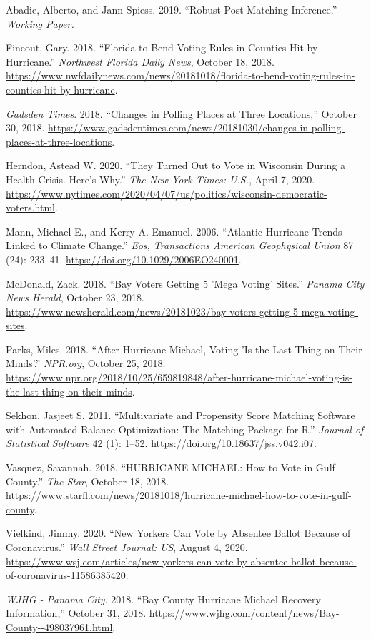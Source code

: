 \documentclass[
  12pt,
]{article}
\newlength{\cslhangindent}
\newenvironment{cslreferences}%
  {\setlength{\parindent}{0pt}%
  \everypar{\setlength{\hangindent}{\cslhangindent}}\ignorespaces}%
  {\par}
\begin{document}
\hypertarget{refs}{}
\begin{cslreferences}
\leavevmode\hypertarget{ref-Abadie2019}{}%
Abadie, Alberto, and Jann Spiess. 2019. ``Robust Post-Matching Inference.'' \emph{Working Paper.}

\leavevmode\hypertarget{ref-Fineout2018}{}%
Fineout, Gary. 2018. ``Florida to Bend Voting Rules in Counties Hit by Hurricane.'' \emph{Northwest Florida Daily News}, October 18, 2018. \url{https://www.nwfdailynews.com/news/20181018/florida-to-bend-voting-rules-in-counties-hit-by-hurricane}.

\leavevmode\hypertarget{ref-gadsdentimes2018}{}%
\emph{Gadsden Times}. 2018. ``Changes in Polling Places at Three Locations,'' October 30, 2018. \url{https://www.gadsdentimes.com/news/20181030/changes-in-polling-places-at-three-locations}.

\leavevmode\hypertarget{ref-Herndon2020}{}%
Herndon, Astead W. 2020. ``They Turned Out to Vote in Wisconsin During a Health Crisis. Here's Why.'' \emph{The New York Times: U.S.}, April 7, 2020. \url{https://www.nytimes.com/2020/04/07/us/politics/wisconsin-democratic-voters.html}.

\leavevmode\hypertarget{ref-Mann2006}{}%
Mann, Michael E., and Kerry A. Emanuel. 2006. ``Atlantic Hurricane Trends Linked to Climate Change.'' \emph{Eos, Transactions American Geophysical Union} 87 (24): 233--41. \url{https://doi.org/10.1029/2006EO240001}.

\leavevmode\hypertarget{ref-McDonald2018}{}%
McDonald, Zack. 2018. ``Bay Voters Getting 5 'Mega Voting' Sites.'' \emph{Panama City News Herald}, October 23, 2018. \url{https://www.newsherald.com/news/20181023/bay-voters-getting-5-mega-voting-sites}.

\leavevmode\hypertarget{ref-Parks2018}{}%
Parks, Miles. 2018. ``After Hurricane Michael, Voting 'Is the Last Thing on Their Minds'.'' \emph{NPR.org}, October 25, 2018. \url{https://www.npr.org/2018/10/25/659819848/after-hurricane-michael-voting-is-the-last-thing-on-their-minds}.

\leavevmode\hypertarget{ref-Sekhon2011}{}%
Sekhon, Jasjeet S. 2011. ``Multivariate and Propensity Score Matching Software with Automated Balance Optimization: The Matching Package for R.'' \emph{Journal of Statistical Software} 42 (1): 1--52. \url{https://doi.org/10.18637/jss.v042.i07}.

\leavevmode\hypertarget{ref-Vasquez2018}{}%
Vasquez, Savannah. 2018. ``HURRICANE MICHAEL: How to Vote in Gulf County.'' \emph{The Star}, October 18, 2018. \url{https://www.starfl.com/news/20181018/hurricane-michael-how-to-vote-in-gulf-county}.

\leavevmode\hypertarget{ref-Vielkind2020}{}%
Vielkind, Jimmy. 2020. ``New Yorkers Can Vote by Absentee Ballot Because of Coronavirus.'' \emph{Wall Street Journal: US}, August 4, 2020. \url{https://www.wsj.com/articles/new-yorkers-can-vote-by-absentee-ballot-because-of-coronavirus-11586385420}.

\leavevmode\hypertarget{ref-WJHG2018}{}%
\emph{WJHG - Panama City}. 2018. ``Bay County Hurricane Michael Recovery Information,'' October 31, 2018. \url{https://www.wjhg.com/content/news/Bay-County--498037961.html}.
\end{cslreferences}
\end{document}
